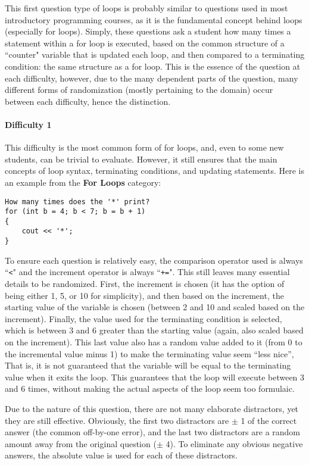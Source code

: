 \documentclass{article}
\begin{document}
This first question type of loops is probably similar to questions used in most introductory programming courses, as it is the fundamental concept behind loops (especially for loops). Simply, these
questions ask a student how many times a statement within a for loop is executed, based on the common structure of a ``counter" variable that is updated each loop, and then compared to a
terminating condition: the same structure as a for loop. This is the essence of the question at each difficulty, however, due to the many dependent parts of the question, many different forms 
of randomization (mostly pertaining to the domain) occur between each difficulty, hence the distinction.

\paragraph{Difficulty 1} \hfill \par 
This difficulty is the most common form of for loops, and, even to some new students, can be trivial to evaluate. However, it still ensures that the main concepts of loop syntax, terminating 
conditions, and updating statements. Here is an example from the \textbf{For Loops} category:

\begin{lstlisting}
How many times does the '*' print? 
for (int b = 4; b < 7; b = b + 1)
{
	cout << '*';
} 
\end{lstlisting}


To ensure each question is relatively easy, the comparison operator used is always ``\verb;<;" and the increment operator is always ``\verb;+=;". This still leaves many essential details to be 
randomized. First, the increment is chosen (it has the option of being either 1, 5, or 10 for simplicity), and then based on the increment, the starting value of the variable is chosen (between 2 and 10 and scaled based on the increment). Finally, the value used for the terminating condition is selected, which is between 3 and 6 greater than the starting value (again, also scaled based 
on the increment). This last value also has a random value added to it (from 0 to the incremental value minus 1) to make the terminating value seem ``less nice'', That is, it is not guaranteed
that the variable will be equal to the terminating value when it exits the loop. This guarantees that the loop will execute between 3 and 6 times, without making the actual aspects of the loop 
seem too formulaic. 

Due to the nature of this question, there are not many elaborate distractors, yet they are still effective. Obviously, the first two distractors are $\pm$ 1 of the correct answer (the common 
off-by-one error), and the last two distractors are a random amount away from the original question ($\pm$ 4). To eliminate any obvious negative answers, the absolute value is used for each of these distractors. 
\end{document}
